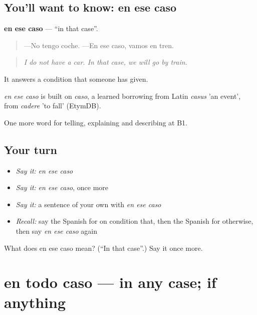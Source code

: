 \subsection*{You'll want to know: en ese caso}
\textbf{en ese caso} — \textquotedblleft{}in that case\textquotedblright{}.

\begin{quote}
—No tengo coche. —En ese caso, vamos en tren.
\end{quote}

\begin{quote}
\emph{I do not have a car. In that case, we will go by train.}
\end{quote}

It answers a condition that someone has given.

\begin{cousinweb}
\emph{en ese caso} is built on \emph{caso}, a learned borrowing from Latin \emph{casus} 'an event', from \emph{cadere} 'to fall' (EtymDB).
\end{cousinweb}

\begin{grammarlens}[title={What you've built}]
One more word for telling, explaining and describing at B1.
\end{grammarlens}

\subsection*{Your turn}
\begin{itemize}
\raggedright
  \item \emph{Say it:} \emph{en ese caso}
  \item \emph{Say it:} \emph{en ese caso}, once more
  \item \emph{Say it:} a sentence of your own with \emph{en ese caso}
  \item \emph{Recall:} say the Spanish for on condition that, then the Spanish for otherwise, then say \emph{en ese caso} again
\end{itemize}

\begin{tcolorbox}[breakable,colback=teal!4,colframe=teal!35!black,title={Before you move on}]
What does en ese caso mean? (\textquotedblleft{}In that case\textquotedblright{}.) Say it once more.
\end{tcolorbox}
\section[en todo caso]{en todo caso — in any case; if anything}

